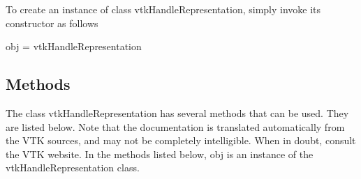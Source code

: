 To create an instance of class vtk\-Handle\-Representation, simply invoke its constructor as follows \begin{DoxyVerb}  obj = vtkHandleRepresentation
\end{DoxyVerb}
 \hypertarget{vtkwidgets_vtkxyplotwidget_Methods}{}\subsection{Methods}\label{vtkwidgets_vtkxyplotwidget_Methods}
The class vtk\-Handle\-Representation has several methods that can be used. They are listed below. Note that the documentation is translated automatically from the V\-T\-K sources, and may not be completely intelligible. When in doubt, consult the V\-T\-K website. In the methods listed below, {\ttfamily obj} is an instance of the vtk\-Handle\-Representation class. 
